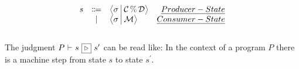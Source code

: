 \begin{prooftree}
\end{prooftree}
\vspace*{0.3cm}

\[
  \begin{array}{lclr}
    s
    & \Coloneqq
    & \stateprd{\sigma}{\mathcal{C}}{\mathcal{D}}
    & \emph{Producer-State}
    \\
    & | & \statecon{\sigma}{\mathcal{M}}
    & \emph{Consumer-State}
    \\[0.5cm]
  \end{array}
\]
The judgment $\semcmd{P}{s}{s^{\prime}}$ can be read like: In the context of a program $P$ there is a machine step from state $s$ to state $s^{\prime}$.

\begin{prooftree}
\end{prooftree}
\vspace*{0.3cm}

\begin{prooftree}
\end{prooftree}
\vspace*{0.3cm}

